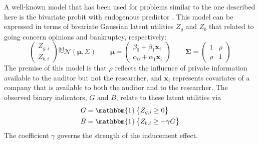 \documentclass[aoas,preprint, 11pt, dvipsnames, table, x11name]{imsart}
\renewcommand{\bm}[1]{\mathbf{#1}}
\theoremstyle{remark}
\begin{document}
A well-known model that has been used for problems similar to the one described here is the bivariate probit with endogenous predictor \citep[Section~ 15.7.3]{Wooldridge-2010}. This model can be expressed in terms of bivariate Gaussian latent utilities $Z_g$ and $Z_b$ that related to going concern opinions and bankruptcy, respectively: 
 \begin{equation}
 \begin{pmatrix}
 Z_{g,i}\\
 Z_{b,i}
 \end{pmatrix}\stackrel{\text{iid}}{\sim}\mathcal{N}(\bm{\mu}, \Sigma)
 \qquad \bm{\mu}=\begin{pmatrix}
\beta_0+\beta_1\bm{x}_i\\
\alpha_0+\alpha_1\bm{x}_i
 \end{pmatrix}
 \qquad
 \bm{\Sigma}=\begin{pmatrix}
 1&\rho\\
 \rho&1
 \end{pmatrix}
 \label{latentutility}
 \end{equation}
 The premise of this model is that $\rho$ reflects the influence of private information available to the auditor but not the researcher, and $\bm{x}_i$ represents covariates of a company that is available to both the auditor and to the researcher. The observed binary indicators, $G$ and $B$, relate to these latent utilities via
 \begin{align}
 G&=\mathbbm{1}\cbr{Z_{g,i}\geq 0}\\
 B&=\mathbbm{1}\cbr{Z_{b,i}\geq -\gamma G}
 \label{align1}
 \end{align}
 The coefficient $\gamma$ governs the strength of the inducement effect.
\end{document}
